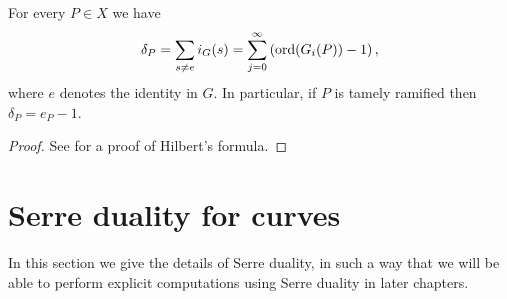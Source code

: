     \begin{thm}\label{hilbertsformula}
    For every $P\in X$ we have
        \begin{equation}
        \delta_P = \sum_{s\neq e}i_G(s)=\sum_{j=0}^{\infty}\left(\operatorname{ord}(G_i(P))-1\right),\label{ramdiv}
        \end{equation}
    where $e$ denotes the identity in $G$.
    In particular, if $P$ is tamely ramified then $\delta_P = e_P -1$.
    \end{thm}
    \begin{proof}
    See \cite[Chap. IV, \S 1, Prop. 4]{localfields} for a proof of Hilbert's formula.
    \end{proof}

 
\section{Serre duality for curves}

In this section we give the details of Serre duality, in such a way that we will be able to perform explicit computations using Serre duality in later chapters.


